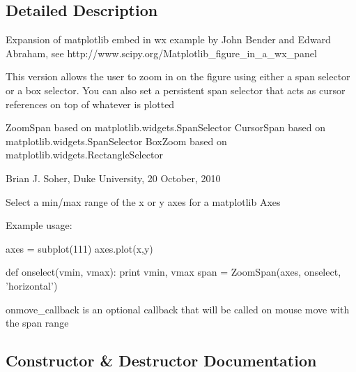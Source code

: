 \subsection{Detailed Description}
\begin{DoxyVerb}Expansion of matplotlib embed in wx example by John Bender and Edward
Abraham, see http://www.scipy.org/Matplotlib_figure_in_a_wx_panel

This version allows the user to zoom in on the figure using either
a span selector or a box selector. You can also set a persistent span
selector that acts as cursor references on top of whatever is plotted

ZoomSpan based on matplotlib.widgets.SpanSelector
CursorSpan based on matplotlib.widgets.SpanSelector
BoxZoom based on matplotlib.widgets.RectangleSelector

Brian J. Soher, Duke University, 20 October, 2010


Select a min/max range of the x or y axes for a matplotlib Axes

Example usage:

  axes = subplot(111)
  axes.plot(x,y)

  def onselect(vmin, vmax):
      print vmin, vmax
  span = ZoomSpan(axes, onselect, 'horizontal')

  onmove_callback is an optional callback that will be called on mouse move
  with the span range\end{DoxyVerb}
 

\subsection{Constructor \& Destructor Documentation}
\hypertarget{class_uni_dec_1_1unidec__modules_1_1isolated__packages_1_1_zoom_span_1_1_zoom_span_afaba16554c36f6662d37bab7664fb247}{}
